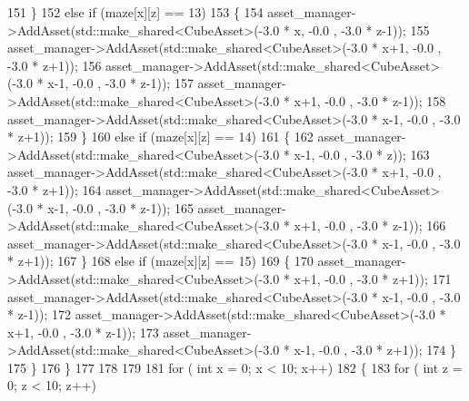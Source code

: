 \begin{DoxyCode}
151                             \}
152                         \textcolor{keywordflow}{else} \textcolor{keywordflow}{if} (maze[x][z] == 13)
153                             \{       
154                                 asset\_manager->AddAsset(std::make\_shared<CubeAsset>(-3.0 * x,   -0.0 , -3.0
       * z-1)); 
155                                 asset\_manager->AddAsset(std::make\_shared<CubeAsset>(-3.0 * x+1, -0.0 , -3.0
       * z+1)); 
156                                 asset\_manager->AddAsset(std::make\_shared<CubeAsset>(-3.0 * x-1, -0.0 , -3.0
       * z-1)); 
157                                 asset\_manager->AddAsset(std::make\_shared<CubeAsset>(-3.0 * x+1, -0.0 , -3.0
       * z-1)); 
158                                 asset\_manager->AddAsset(std::make\_shared<CubeAsset>(-3.0 * x-1, -0.0 , -3.0
       * z+1)); 
159                             \}
160                         \textcolor{keywordflow}{else} \textcolor{keywordflow}{if} (maze[x][z] == 14)
161                             \{   
162                                 asset\_manager->AddAsset(std::make\_shared<CubeAsset>(-3.0 * x-1, -0.0 , -3.0
       * z)); 
163                                 asset\_manager->AddAsset(std::make\_shared<CubeAsset>(-3.0 * x+1, -0.0 , -3.0
       * z+1));
164                                 asset\_manager->AddAsset(std::make\_shared<CubeAsset>(-3.0 * x-1, -0.0 , -3.0
       * z-1));
165                                 asset\_manager->AddAsset(std::make\_shared<CubeAsset>(-3.0 * x+1, -0.0 , -3.0
       * z-1));
166                                 asset\_manager->AddAsset(std::make\_shared<CubeAsset>(-3.0 * x-1, -0.0 , -3.0
       * z+1));
167                             \}
168                         \textcolor{keywordflow}{else} \textcolor{keywordflow}{if} (maze[x][z] == 15)
169                             \{   
170                                 asset\_manager->AddAsset(std::make\_shared<CubeAsset>(-3.0 * x+1, -0.0 , -3.0
       * z+1)); 
171                                 asset\_manager->AddAsset(std::make\_shared<CubeAsset>(-3.0 * x-1, -0.0 , -3.0
       * z-1)); 
172                                 asset\_manager->AddAsset(std::make\_shared<CubeAsset>(-3.0 * x+1, -0.0 , -3.0
       * z-1)); 
173                                 asset\_manager->AddAsset(std::make\_shared<CubeAsset>(-3.0 * x-1, -0.0 , -3.0
       * z+1)); 
174                             \}
175                     \}
176             \}
177 
178 
179 
181         \textcolor{keywordflow}{for} ( \textcolor{keywordtype}{int}  x = 0; x < 10; x++)
182             \{   
183                 \textcolor{keywordflow}{for} ( \textcolor{keywordtype}{int} z = 0; z < 10; z++)

\end{DoxyCode}
